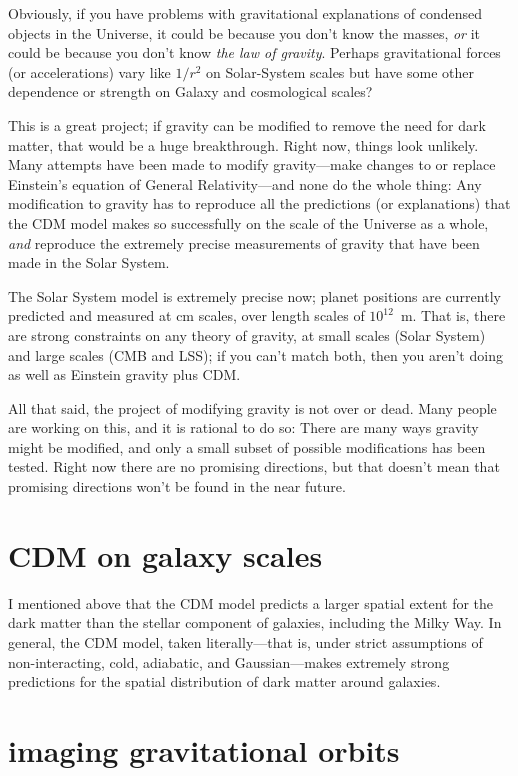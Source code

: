 \documentclass[12pt]{article}
\begin{document}
Obviously, if you have problems with gravitational explanations of
condensed objects in the Universe, it could be because you don't know
the masses, \emph{or} it could be because you don't know \emph{the law
  of gravity}.  Perhaps gravitational forces (or accelerations) vary
like $1/r^2$ on Solar-System scales but have some other dependence or
strength on Galaxy and cosmological scales?

This is a great project; if gravity can be modified to remove the need
for dark matter, that would be a huge breakthrough.  Right now, things
look unlikely.  Many attempts have been made to modify gravity---make
changes to or replace Einstein's equation of General Relativity---and
none do the whole thing: Any modification to gravity has to reproduce
all the predictions (or explanations) that the CDM model makes so
successfully on the scale of the Universe as a whole, \emph{and}
reproduce the extremely precise measurements of gravity that have been
made in the Solar System.

The Solar System model is extremely precise now; planet positions are
currently predicted and measured at cm scales, over length scales of
$10^12$~m.  That is, there are strong constraints on any theory of
gravity, at small scales (Solar System) and large scales (CMB and
LSS); if you can't match both, then you aren't doing as well as
Einstein gravity plus CDM.

All that said, the project of modifying gravity is not over or dead.
Many people are working on this, and it is rational to do so: There
are many ways gravity might be modified, and only a small subset of
possible modifications has been tested.  Right now there are no
promising directions, but that doesn't mean that promising directions
won't be found in the near future.

\section{CDM on galaxy scales}

I mentioned above that the CDM model predicts a larger spatial extent
for the dark matter than the stellar component of galaxies, including
the Milky Way.  In general, the CDM model, taken literally---that is,
under strict assumptions of non-interacting, cold, adiabatic, and
Gaussian---makes extremely strong predictions for the spatial
distribution of dark matter around galaxies.

\section{imaging gravitational orbits}
\end{document}
